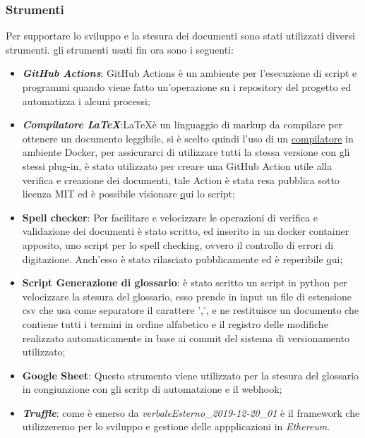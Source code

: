 \subsubsection{Strumenti}
Per supportare lo sviluppo e la stesura dei documenti sono stati utilizzati diversi
strumenti.
gli strumenti usati fin ora sono i seguenti:
\begin{itemize}
  \item \textbf{\textit{GitHub Actions\glos}}:
  GitHub Actions è un ambiente per l'esecuzione di script e programmi quando viene
  fatto un'operazione su i repository del progetto ed automatizza i alcuni processi;
  \item \textbf{\textit{Compilatore \LaTeX\glos}}:\LaTeX \space è un linguaggio
  di markup da compilare per ottenere un documento leggibile, si è scelto quindi l'uso di un
  \href{https://GitHub.com/dante-ev/docker-texlive}{compilatore} in ambiente Docker\glos,
  per assicurarci di utilizzare tutti la stessa versione con gli stessi plug-in,
  è stato utilizzato per creare una GitHub Action utile
  alla verifica e creazione dei documenti, tale Action è stata resa pubblica sotto licenza MIT
  ed è possibile visionare \href{https://GitHub.com/Jatus93/Latex-multicompiler}qui lo script;
  \item \textbf{Spell checker}:
  Per facilitare e velocizzare le operazioni di verifica e validazione dei documenti è
  stato scritto, ed inserito in un docker container apposito, uno script per lo
  spell checking, ovvero il controllo di errori di digitazione.
  Anch'esso è stato rilasciato pubblicamente ed è reperibile \href{https://GitHub.com/Jatus93/spellCheck}qui;
  \item \textbf{Script Generazione di glossario}: è stato scritto un script in python per velocizzare la stesura
  del glossario, esso prende in input un file di estensione csv che usa come
  separatore il carattere ',', e ne restituisce un documento che contiene tutti i
  termini in ordine alfabetico e il registro delle modifiche realizzato automaticamente
  in base ai commit del sistema di versionamento utilizzato;
  \item \textbf{Google Sheet}: Questo strumento viene utilizzato per la stesura del glossario
  in congiunzione con gli scritp di automatzione e il webhook;
  \item \textbf{\textit{Truffle\glos}}: come è emerso da \textit{verbaleEsterno\_2019-12-20\_01} è il framework che
  utilizzeremo per lo sviluppo e gestione delle appplicazioni in \textit{Ethereum\glos}.
\end{itemize}
